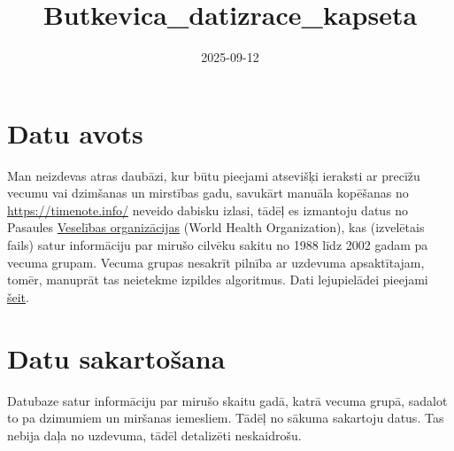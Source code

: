 \documentclass[
]{article}
\title{Butkevica\_datizrace\_kapseta}
\author{}
\date{\vspace{-2.5em}2025-09-12}
\newenvironment{Shaded}{\begin{snugshade}}{\end{snugshade}}
\newcommand{\AttributeTok}[1]{\textcolor[rgb]{0.13,0.29,0.53}{#1}}
\newcommand{\CommentTok}[1]{\textcolor[rgb]{0.56,0.35,0.01}{\textit{#1}}}
\newcommand{\ConstantTok}[1]{\textcolor[rgb]{0.56,0.35,0.01}{#1}}
\newcommand{\DecValTok}[1]{\textcolor[rgb]{0.00,0.00,0.81}{#1}}
\newcommand{\FunctionTok}[1]{\textcolor[rgb]{0.13,0.29,0.53}{\textbf{#1}}}
\newcommand{\NormalTok}[1]{#1}
\newcommand{\OtherTok}[1]{\textcolor[rgb]{0.56,0.35,0.01}{#1}}
\newcommand{\SpecialCharTok}[1]{\textcolor[rgb]{0.81,0.36,0.00}{\textbf{#1}}}
\newcommand{\StringTok}[1]{\textcolor[rgb]{0.31,0.60,0.02}{#1}}
\begin{document}
\maketitle

\section{Datu avots}\label{datu-avots}

Man neizdevas atras daubāzi, kur būtu pieejami atsevišķi ieraksti ar
precīžu vecumu vai dzimšanas un mirstības gadu, savukārt manuāla
kopēšanas no \url{https://timenote.info/} neveido dabisku izlasi, tādēļ
es izmantoju datus no Pasaules \href{https://www.who.int/}{Veselības
organizācijas} (World Health Organization), kas (izvelētais fails) satur
informāciju par mirušo cilvēku sakitu no 1988 līdz 2002 gadam pa vecuma
grupam. Vecuma grupas nesakrīt pilnība ar uzdevuma apsaktītajam, tomēr,
manuprāt tas neietekme izpildes algoritmus. Dati lejupielādei pieejami
\href{https://www.who.int/data/data-collection-tools/who-mortality-database}{šeit}.

\section{Datu sakartošana}\label{datu-sakartoux161ana}

Datubaze satur informāciju par mirušo skaitu gadā, katrā vecuma grupā,
sadalot to pa dzimumiem un miršanas iemesliem. Tādēļ no sākuma sakartoju
datus. Tas nebija daļa no uzdevuma, tādēl detalizēti neskaidrošu.

\begin{Shaded}
\end{Shaded}
\end{document}
